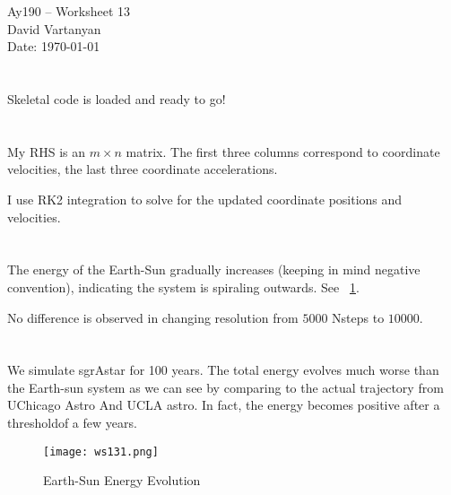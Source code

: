 \documentclass[11pt,letterpaper]{article}
\begin{document}
\begin{center}
\Large
Ay190 -- Worksheet 13\\
David Vartanyan\\
Date: \today
\end{center}

\section{}
Skeletal code is loaded and ready to go!

\section{}
My RHS  is an $m \times n$ matrix. The first three columns correspond to coordinate velocities, the last three coordinate accelerations.

I use RK2 integration to solve for the updated coordinate positions and velocities.

\section{}
The energy of the Earth-Sun gradually increases (keeping in mind negative convention), indicating the system is spiraling outwards. See ~\ref{fig:1}.

No difference is observed in changing resolution from $5000$ Nsteps to $10000$.

\section{}
We simulate sgrAstar for 100 years. The total energy evolves much worse than the Earth-sun system as we can see by comparing to the actual trajectory from UChicago Astro And UCLA astro. In fact, the energy becomes positive after a thresholdof a few years.

\begin{figure}[bth]
\centering
\texttt{[image: ws131.png]}
\caption{Earth-Sun Energy Evolution}
\label{fig:1}
\end{figure}
\end{document}
